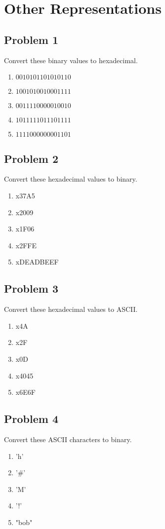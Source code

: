 \documentclass{article}
\begin{document}
\section*{Other Representations}
\subsection*{Problem 1}
Convert these binary values to hexadecimal.
\begin{enumerate}[label=\alph*.]
    \item $0010 1011 0101 0110$
    \item $1001 0100 1000 1111$
    \item $0011 1100 0001 0010$
    \item $1011 1110 1110 1111$
    \item $1111 0000 0000 1101$
\end{enumerate}

\subsection*{Problem 2}
Convert these hexadecimal values to binary.
\begin{enumerate}[label=\alph*.]
    \item x37A5
    \item x2009
    \item x1F06
    \item x2FFE
    \item xDEADBEEF
\end{enumerate}

\subsection*{Problem 3}
Convert these hexadecimal values to ASCII.
\begin{enumerate}[label=\alph*.]
    \item x4A
    \item x2F
    \item x0D
    \item x4045
    \item x6E6F
\end{enumerate}

\subsection*{Problem 4}
Convert these ASCII characters to binary.
\begin{enumerate}[label=\alph*.]
    \item 'h'
    \item '#'
    \item 'M'
    \item '!'
    \item "bob"
\end{enumerate}
\end{document}
